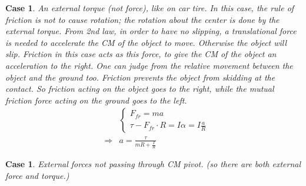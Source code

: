 \documentclass{article}
\newtheorem{case}[theorem]{Case}
\begin{document}
\newpage

\begin{case}
An external torque (not force), like on car tire.\newline
\newline
In this case, the rule of friction is not to cause rotation; the rotation
about the center is done by the external torque. From 2nd law, in order to
have no slipping, a translational force is needed to accelerate the CM of
the object to move. Otherwise the object will slip. Friction in this case
acts as this \emph{force}, to give the CM of the object an acceleration to
the right. One can judge from the relative movement between the object and
the ground too. Friction prevents the object from skidding at the contact.
So friction acting on the object goes to the right, while the mutual
friction force acting on the ground goes to the left.%
\begin{eqnarray*}
&&\left\{ 
\begin{array}{c}
F_{fr}=ma \\ 
\tau -F_{fr}\cdot R=I\alpha =I\frac{a}{R}%
\end{array}%
\right. \\
&\Rightarrow &a=\frac{\tau }{mR+\frac{I}{R}}
\end{eqnarray*}%

\end{case}

\newpage 

\begin{case}
External forces not passing through CM pivot. (so there are both external
force and torque.)
\end{case}
\end{document}
